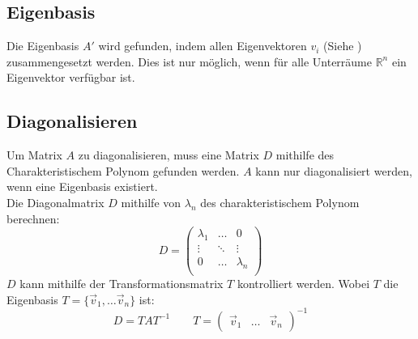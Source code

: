 \subsection{Eigenbasis}\label{eigenbasis}
Die Eigenbasis $A'$ wird gefunden, indem allen Eigenvektoren $v_i$ (Siehe ) zusammengesetzt werden. Dies ist nur möglich, wenn für alle Unterräume $\mathbb{R}^n$ ein Eigenvektor verfügbar ist.

\subsection{Diagonalisieren}\label{diagonalisieren}
Um Matrix $A$ zu diagonalisieren, muss eine Matrix $D$ mithilfe des Charakteristischem Polynom gefunden werden. $A$ kann nur diagonalisiert werden, wenn eine Eigenbasis existiert. \\
Die Diagonalmatrix $D$ mithilfe von $\lambda_n$ des charakteristischem Polynom berechnen:
\[D = \begin{pmatrix}
	\lambda_1 & \dots & 0 \\
	\vdots & \ddots & \vdots \\
	0 & \dots & \lambda_n \\
\end{pmatrix}\]
\noindent $D$ kann mithilfe der Transformationsmatrix $T$ kontrolliert werden.  Wobei $T$ die Eigenbasis $T = \{\vec{v}_1,\dots\vec{v}_n\}$ ist:
\[
D = TAT^{-1} \qquad T = \begin{pmatrix}
	\vec{v}_1 & \dots & \vec{v}_n
\end{pmatrix}^{-1}\]